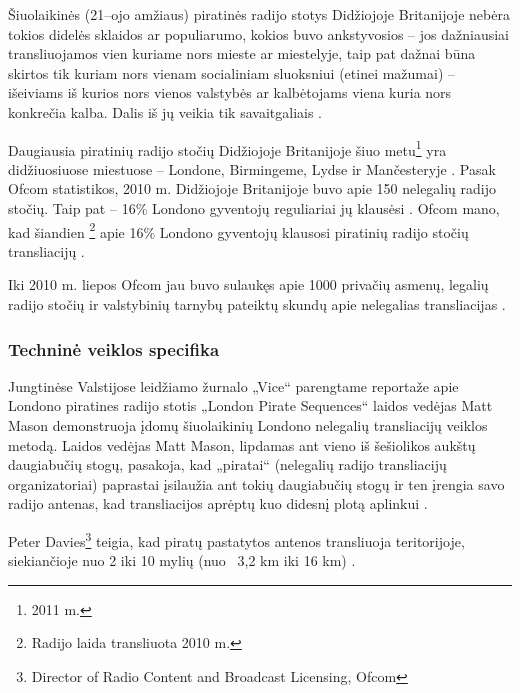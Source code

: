 \documentclass[kursinis-darbas]{vukf}
\begin{document}
Šiuolaikinės (21--ojo amžiaus) piratinės radijo stotys Didžiojoje Britanijoje nebėra tokios didelės sklaidos ar populiarumo, kokios buvo ankstyvosios – jos dažniausiai transliuojamos vien kuriame nors mieste ar miestelyje, taip pat dažnai būna skirtos tik kuriam nors vienam socialiniam sluoksniui (etinei mažumai) – išeiviams iš kurios nors vienos valstybės ar kalbėtojams viena kuria nors konkrečia kalba. Dalis iš jų veikia tik savaitgaliais \cite[p.~238]{chs_encyclopedia_of_radio}.

Daugiausia piratinių radijo stočių Didžiojoje Britanijoje šiuo metu\footnote{2011 m.} yra didžiuosiuose miestuose – Londone, Birmingeme, Lydse ir Mančesteryje \cite{ofcom_illegal_broadcasting_factsheet}. Pasak \gls{Ofcom} statistikos, 2010 m. Didžiojoje Britanijoje buvo apie 150 nelegalių radijo stočių. Taip pat – 16\% Londono gyventojų reguliariai jų klausėsi \cite{bbc_radio_4_do_pirates_rule_the_air_waves}. \gls{Ofcom} mano, kad šiandien \footnote{Radijo laida transliuota 2010 m.} apie 16\% Londono gyventojų klausosi piratinių radijo stočių transliacijų \cite{bbc_radio_4_do_pirates_rule_the_air_waves}.

Iki 2010 m. liepos \gls{Ofcom} jau buvo sulaukęs apie 1000 privačių asmenų, legalių radijo stočių ir valstybinių tarnybų pateiktų skundų apie nelegalias transliacijas \cite{bbc_radio_4_do_pirates_rule_the_air_waves}.


\subsubsection{Techninė veiklos specifika}

Jungtinėse Valstijose leidžiamo žurnalo „Vice“ parengtame reportaže apie Londono piratines radijo stotis „London Pirate Sequences“ \cite{vice_london_pirate_sequences} laidos vedėjas Matt Mason demonstruoja įdomų šiuolaikinių Londono nelegalių transliacijų veiklos metodą. Laidos vedėjas Matt Mason, lipdamas ant vieno iš šešiolikos aukštų daugiabučių stogų, pasakoja, kad „piratai“ (nelegalių radijo transliacijų organizatoriai) paprastai įsilaužia ant tokių daugiabučių stogų ir ten įrengia savo radijo antenas, kad transliacijos aprėptų kuo didesnį plotą aplinkui \cite{vice_london_pirate_sequences}.

Peter Davies\footnote{Director of Radio Content and Broadcast Licensing, \gls{Ofcom}} teigia, kad piratų pastatytos antenos transliuoja teritorijoje, siekiančioje nuo 2 iki 10 mylių (nuo ~3,2 km iki 16 km) \cite{bbc_radio_4_do_pirates_rule_the_air_waves}.
\end{document}
